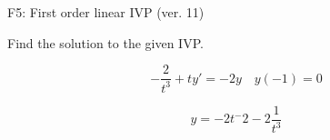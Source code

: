 \begin{exercise}
  \begin{exerciseTitle}F5: First order linear IVP (ver. 11)\end{exerciseTitle}
  \begin{exerciseStatement}
    
Find the solution to the given IVP.

    
\[-\frac{2}{t^{3}} +ty'= -2 y \hspace{1em} y( -1 ) = 0\]

  \end{exerciseStatement}
  \begin{exerciseAnswer}
    
\[y= -2 t^ -2 -2 \frac{1}{t^{3}}\]

  \end{exerciseAnswer}
\end{exercise}